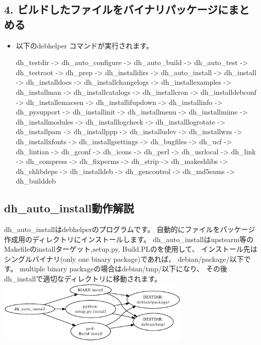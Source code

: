 \documentclass[mingoth,a4paper]{jsarticle}
\begin{document}
\subsection[containsverbatim]{4. ビルドしたファイルをバイナリパッケージにまとめる}
\begin{itemize}

\item 以下のdebhelper コマンドが実行されます。
\begin{commandline}
dh_testdir -> dh_auto_configure -> dh_auto_build -> dh_auto_test
-> dh_testroot -> dh_prep -> dh_installdirs -> dh_auto_install
-> dh_install -> dh_installdocs -> dh_installchangelogs
-> dh_installexamples -> dh_installman -> dh_installcatalogs
-> dh_installcron -> dh_installdebconf -> dh_installemacsen
-> dh_installifupdown -> dh_installinfo -> dh_pysupport
-> dh_installinit -> dh_installmenu -> dh_installmime
-> dh_installmodules -> dh_installlogcheck -> dh_installlogrotate
-> dh_installpam -> dh_installppp -> dh_installudev -> dh_installwm
-> dh_installxfonts -> dh_installgsettings -> dh_bugfiles -> dh_ucf
-> dh_lintian -> dh_gconf -> dh_icons -> dh_perl -> dh_usrlocal
-> dh_link -> dh_compress -> dh_fixperms -> dh_strip -> dh_makeshlibs
-> dh_shlibdeps -> dh_installdeb -> dh_gencontrol -> dh_md5sums
-> dh_builddeb
\end{commandline}
\end{itemize}

\subsection{dh\_auto\_install動作解説}

dh\_auto\_installはdebhelperのプログラムです。
自動的にファイルをパッケージ作成用のディレクトリにインストールします。
dh\_auto\_installはupstearm等のMakefileのinstallターゲット,setup.py,
Build.PLのを使用して、
インストール先はシングルバイナリ(only one binary package)であれば、
debian/package/以下です。
multiple binary packageの場合はdebian/tmp/以下になり、
その後dh\_installで適切なディレクトリに移動されます。
\includegraphics[height=3cm]{image201303/dh_auto_install1.eps}
\end{document}

